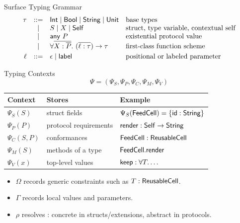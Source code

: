 \begin{frame}{Surface Typing Grammar}
\small
\[
\begin{array}{rcll}
\tau
&::=&
\mathsf{Int} \mid \mathsf{Bool} \mid \mathsf{String} \mid \mathsf{Unit}
& \text{base types}
\\
&\mid&
S \mid X \mid \mathsf{Self}
& \text{struct, type variable, contextual self}
\\
&\mid&
\mathsf{any}\ P
& \text{existential protocol value}
\\
&\mid&
\forall \overline{X:\overline{P}}.\ (\overline{\ell:\tau}) \to \tau
& \text{first-class function scheme}
\\[1mm]
\ell
&::=&
\epsilon \mid \mathsf{label}
& \text{positional or labeled parameter}
\end{array}
\]
\end{frame}

\begin{frame}{Typing Contexts}
\small
\[
\Psi=(\Psi_S,\Psi_P,\Psi_C,\Psi_M,\Psi_V)
\]

\begin{center}
\scriptsize
\setlength{\tabcolsep}{3pt}
\renewcommand{\arraystretch}{1.05}
\begin{tabular}{lll}
\toprule
Context & Stores & Example \\
\midrule
$\Psi_S(S)$ & struct fields & $\Psi_S(\mathsf{FeedCell})=\{\mathsf{id}:\mathsf{String}\}$ \\
$\Psi_P(P)$ & protocol requirements & $\mathsf{render}:\mathsf{Self}\to\mathsf{String}$ \\
$\Psi_C(S,P)$ & conformances & $\mathsf{FeedCell}:\mathsf{ReusableCell}$ \\
$\Psi_M(S)$ & methods of a type & $\mathsf{FeedCell.render}$ \\
$\Psi_V(x)$ & top-level values & $\mathsf{keep}:\forall T.\ldots$ \\
\bottomrule
\end{tabular}
\end{center}

\vspace{1mm}
\begin{itemize}
  \item $\Omega$ records generic constraints such as $T:\mathsf{ReusableCell}$.
  \item $\Gamma$ records local values and parameters.
  \item $\rho$ resolves \Self: concrete in structs/extensions, abstract in protocols.
\end{itemize}
\end{frame}

